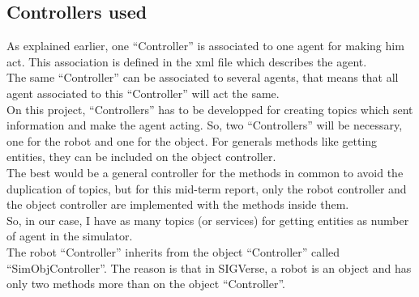 \noindent\begin{minipage}{\linewidth}%
\label{fig:sig_ros_general}%
\end{minipage}

\subsection{Controllers used}
As explained earlier, one ``Controller'' is associated to one agent for making him act. This association is defined in the xml file which describes the agent.\\
The same ``Controller'' can be associated to several agents, that means that all agent associated to this ``Controller'' will act the same.\\
On this project, ``Controllers'' has to be developped for creating topics which sent information and make the agent acting. So, two ``Controllers'' will be necessary, one for the robot and one for the object. For generals methods like getting entities, they can be included on the object controller.\\
The best would be a general controller for the methods in common to avoid the duplication of topics, but for this mid-term report, only the robot controller and the object controller are implemented with the methods inside them.\\
So, in our case, I have as many topics (or services) for getting entities as number of agent in the simulator.\\

The robot ``Controller'' inherits from the object ``Controller'' called ``SimObjController''. The reason is that in SIGVerse, a robot is an object and has only two methods more than on the object ``Controller''.\\

